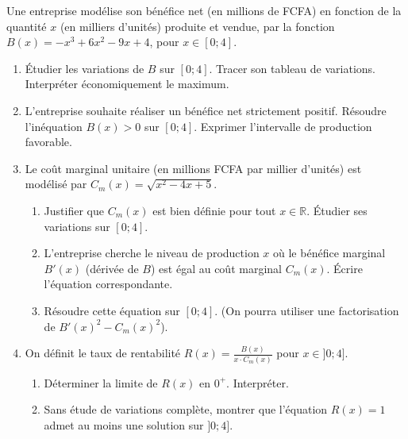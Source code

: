 \documentclass[11pt]{article}
\begin{document}
\begin{exercice}
Une entreprise modélise son bénéfice net (en millions de FCFA) en fonction de la quantité $x$ (en milliers d'unités) produite et vendue, par la fonction $B(x) = -x^3 + 6x^2 - 9x + 4$, pour $x \in [0; 4]$.
\begin{enumerate}
    \item Étudier les variations de $B$ sur $[0; 4]$. Tracer son tableau de variations. Interpréter économiquement le maximum.
    \item L'entreprise souhaite réaliser un bénéfice net strictement positif. Résoudre l'inéquation $B(x) > 0$ sur $[0; 4]$. Exprimer l'intervalle de production favorable.
    \item Le coût marginal unitaire (en millions FCFA par millier d'unités) est modélisé par $C_m(x) = \sqrt{x^2 - 4x + 5}$.
    \begin{enumerate}
        \item Justifier que $C_m(x)$ est bien définie pour tout $x \in \mathbb{R}$. Étudier ses variations sur $[0; 4]$.
        \item L'entreprise cherche le niveau de production $x$ où le bénéfice marginal $B'(x)$ (dérivée de $B$) est égal au coût marginal $C_m(x)$. Écrire l'équation correspondante.
        \item Résoudre cette équation sur $[0; 4]$. (On pourra utiliser une factorisation de $B'(x)^2 - C_m(x)^2$).
    \end{enumerate}
    \item On définit le taux de rentabilité $R(x) = \frac{B(x)}{x \cdot C_m(x)}$ pour $x \in ]0; 4]$. 
    \begin{enumerate}
        \item Déterminer la limite de $R(x)$ en $0^+$. Interpréter.
        \item Sans étude de variations complète, montrer que l'équation $R(x)=1$ admet au moins une solution sur $]0; 4]$. 
    \end{enumerate}
\end{enumerate}
\end{exercice}
\end{document}
